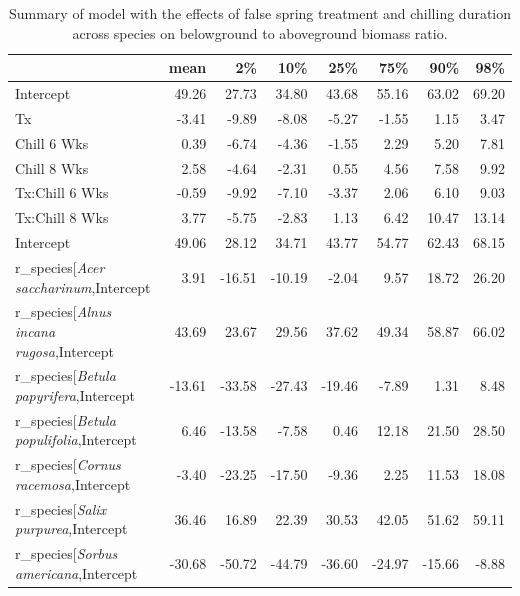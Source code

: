 \documentclass{article}\usepackage[]{graphicx}\usepackage[]{color}
\makeatletter
\newenvironment{kframe}{%
 \def\at@end@of@kframe{}%
 \ifinner\ifhmode%
  \def\at@end@of@kframe{\end{minipage}}%
  \begin{minipage}{\columnwidth}%
 \fi\fi%
 \def\FrameCommand##1{\hskip\@totalleftmargin \hskip-\fboxsep
 \colorbox{shadecolor}{##1}\hskip-\fboxsep
     \hskip-\linewidth \hskip-\@totalleftmargin \hskip\columnwidth}%
 \MakeFramed {\advance\hsize-\width
   \@totalleftmargin\z@ \linewidth\hsize
   \@setminipage}}%
 {\par\unskip\endMakeFramed%
 \at@end@of@kframe}
\makeatother
\begin{document}
\newpage
\begin{kframe}


{\ttfamily\noindent\bfseries\color{errorcolor}{\#\# Error in gsub("{}r\textbackslash{}\textbackslash{}\_species["{}, "{}"{}, modoutput\$term): invalid regular expression 'r\textbackslash{}\_species[', reason 'Missing ']''}}\end{kframe}%
\begin{longtable}{lrrrrrrr}
\caption{Summary of model with the effects of false spring treatment and chilling duration across species on belowground to aboveground biomass ratio.} \\ 
  \hline
 & mean & 2\% & 10\% & 25\% & 75\% & 90\% & 98\% \\ 
  \hline \endhead  \hline
Intercept & 49.26 & 27.73 & 34.80 & 43.68 & 55.16 & 63.02 & 69.20 \\ 
  Tx & -3.41 & -9.89 & -8.08 & -5.27 & -1.55 & 1.15 & 3.47 \\ 
  Chill 6 Wks & 0.39 & -6.74 & -4.36 & -1.55 & 2.29 & 5.20 & 7.81 \\ 
  Chill 8 Wks & 2.58 & -4.64 & -2.31 & 0.55 & 4.56 & 7.58 & 9.92 \\ 
  Tx:Chill 6 Wks & -0.59 & -9.92 & -7.10 & -3.37 & 2.06 & 6.10 & 9.03 \\ 
  Tx:Chill 8 Wks & 3.77 & -5.75 & -2.83 & 1.13 & 6.42 & 10.47 & 13.14 \\ 
  Intercept & 49.06 & 28.12 & 34.71 & 43.77 & 54.77 & 62.43 & 68.15 \\ 
  r_species[\textit{Acer saccharinum},Intercept & 3.91 & -16.51 & -10.19 & -2.04 & 9.57 & 18.72 & 26.20 \\ 
  r_species[\textit{Alnus incana rugosa},Intercept & 43.69 & 23.67 & 29.56 & 37.62 & 49.34 & 58.87 & 66.02 \\ 
  r_species[\textit{Betula papyrifera},Intercept & -13.61 & -33.58 & -27.43 & -19.46 & -7.89 & 1.31 & 8.48 \\ 
  r_species[\textit{Betula populifolia},Intercept & 6.46 & -13.58 & -7.58 & 0.46 & 12.18 & 21.50 & 28.50 \\ 
  r_species[\textit{Cornus racemosa},Intercept & -3.40 & -23.25 & -17.50 & -9.36 & 2.25 & 11.53 & 18.08 \\ 
  r_species[\textit{Salix purpurea},Intercept & 36.46 & 16.89 & 22.39 & 30.53 & 42.05 & 51.62 & 59.11 \\ 
  r_species[\textit{Sorbus americana},Intercept & -30.68 & -50.72 & -44.79 & -36.60 & -24.97 & -15.66 & -8.88 \\ 

\end{longtable}
\end{document}
